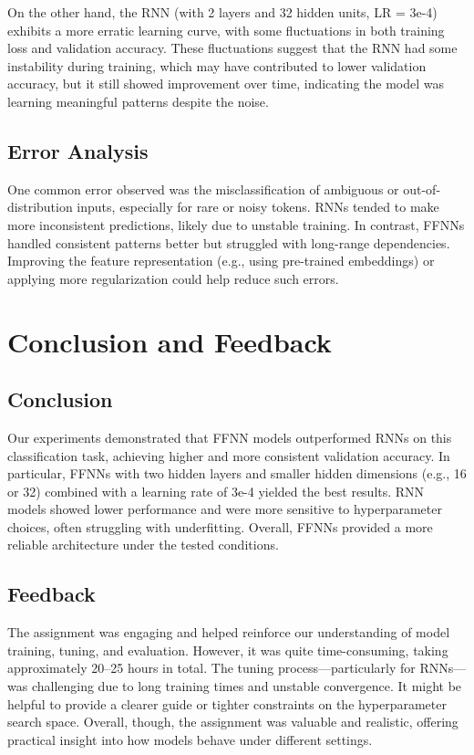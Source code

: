 \documentclass[a4paper]{article}
\begin{document}
On the other hand, the RNN (with 2 layers and 32 hidden units, LR = 3e-4) exhibits a more erratic learning curve, with some fluctuations in both training loss and validation accuracy. These fluctuations suggest that the RNN had some instability during training, which may have contributed to lower validation accuracy, but it still showed improvement over time, indicating the model was learning meaningful patterns despite the noise.


\subsection*{Error Analysis}
One common error observed was the misclassification of ambiguous or out-of-distribution inputs, especially for rare or noisy tokens. RNNs tended to make more inconsistent predictions, likely due to unstable training. In contrast, FFNNs handled consistent patterns better but struggled with long-range dependencies. Improving the feature representation (e.g., using pre-trained embeddings) or applying more regularization could help reduce such errors.


\section{Conclusion and Feedback}


\subsection*{Conclusion}
Our experiments demonstrated that FFNN models outperformed RNNs on this classification task, achieving higher and more consistent validation accuracy. In particular, FFNNs with two hidden layers and smaller hidden dimensions (e.g., 16 or 32) combined with a learning rate of 3e-4 yielded the best results. RNN models showed lower performance and were more sensitive to hyperparameter choices, often struggling with underfitting. Overall, FFNNs provided a more reliable architecture under the tested conditions.


\subsection*{Feedback}
The assignment was engaging and helped reinforce our understanding of model training, tuning, and evaluation. However, it was quite time-consuming, taking approximately 20–25 hours in total. The tuning process—particularly for RNNs—was challenging due to long training times and unstable convergence. It might be helpful to provide a clearer guide or tighter constraints on the hyperparameter search space. Overall, though, the assignment was valuable and realistic, offering practical insight into how models behave under different settings.
\end{document}

